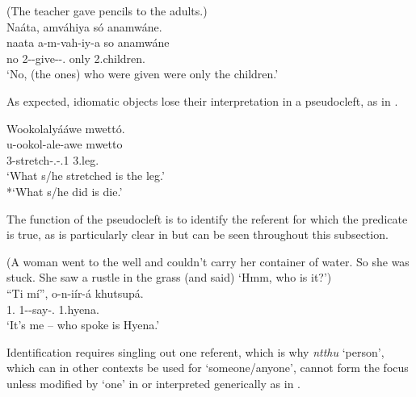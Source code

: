\documentclass[output=paper]{langscibook}
\begin{document}
\z

\ea
\label{bkm:Ref95921046}
(The teacher gave pencils to the adults.)\\
Naáta, amváhiya só anamwáne.\\
\gll
naata  a-m-vah-iy-a  so  anamwáne\\
no  2-\PRS{}-give-\PASS{}-\FV{}.\REL{}  only  2.children.\PRL{}\\
\glt
‘No, (the ones) who were given were only the children.’\\


\z

As expected, idiomatic objects lose their interpretation in a pseudocleft, as in .

\ea
\label{bkm:Ref110335791}
Wookolalyááwe mwettó.\\
\gll
u-ookol-ale-awe  mwetto\\
3-stretch-\PFV{}.\REL{}-\POSS{}.1  3.leg.\PRL{}\\
\glt
‘What s/he stretched is the leg.’\\
*`What s/he did is die.’


\z

The function of the pseudocleft is to identify the referent for which the predicate is true, as is particularly clear in  but can be seen throughout this subsection.


\ea
\label{bkm:Ref110409158}
(A woman went to the well and couldn’t carry her container of water. So she was stuck. She saw a rustle in the grass (and said) ‘Hmm, who is it?’)\\
\gll
“Ti  mí”,  o{}-n{}-iír{}-á  khutsupá.\\
\COP{}  1\SG{}.\PRO{}  1-\PRS{}-say-\FV{}.\REL{}  1.hyena.\PRL{}\\
\glt
‘It’s me – who spoke is Hyena.’\\


\z

Identification requires singling out one referent, which is why \textit{ntthu} ‘person’, which can in other contexts be used for ‘someone/anyone’, cannot form the focus unless modified by ‘one’ in  or interpreted generically as in . 
\end{document}
